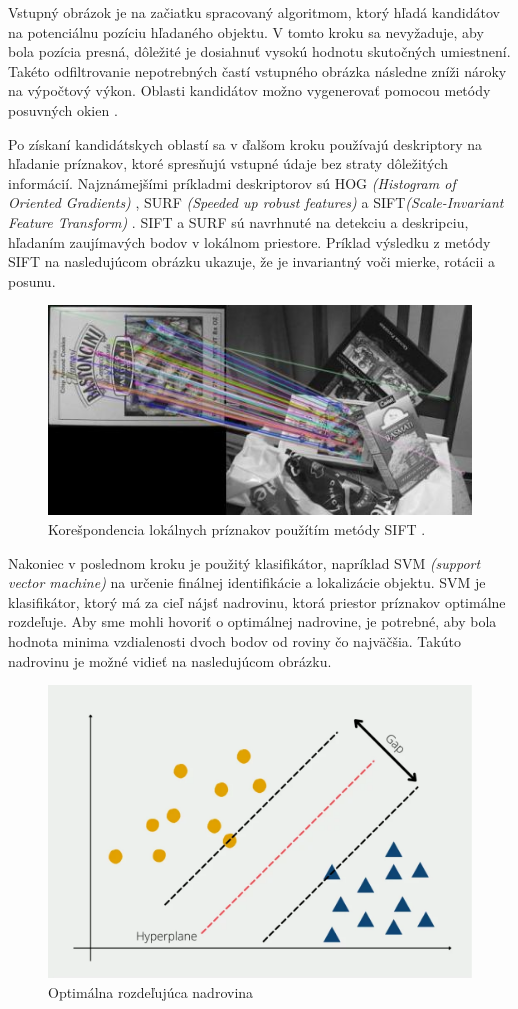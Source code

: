 Vstupný obrázok je na začiatku spracovaný algoritmom, ktorý hľadá kandidátov na potenciálnu pozíciu hľadaného objektu. V tomto kroku sa nevyžaduje, aby bola pozícia presná, dôležité je dosiahnuť vysokú hodnotu skutočných umiestnení. Takéto odfiltrovanie nepotrebných častí vstupného obrázka následne zníži nároky na výpočtový výkon. Oblasti kandidátov možno vygenerovať pomocou metódy posuvných okien \cite{sel-search}.

Po získaní kandidátskych oblastí sa v ďalšom kroku používajú deskriptory na hľadanie príznakov, ktoré spresňujú vstupné údaje bez straty dôležitých informácií. Najznámejšími príkladmi deskriptorov sú HOG \textit{(Histogram of Oriented Gradients)} \cite{HOG}, SURF \textit{(Speeded up robust features)} \cite{SURF} a SIFT\textit{(Scale-Invariant Feature Transform)} \cite{SIFT}. SIFT a SURF sú navrhnuté na detekciu a deskripciu, hľadaním zaujímavých bodov v lokálnom priestore. Príklad výsledku z metódy SIFT na nasledujúcom obrázku ukazuje, že je invariantný voči mierke, rotácii a posunu.

\begin{figure}[H]
    \centering
    \includegraphics[width=.6\textwidth]{images/01/sift.jpeg}
    \caption{Korešpondencia lokálnych príznakov použítím metódy SIFT \cite{sift-img}.}
    \label{img:sift}
\end{figure}

Nakoniec v poslednom kroku je použitý klasifikátor, napríklad SVM \textit{(support vector machine)} \cite{SVM} na určenie finálnej identifikácie a lokalizácie objektu.
SVM je klasifikátor, ktorý má za cieľ nájsť nadrovinu, ktorá priestor príznakov optimálne rozdeľuje. Aby sme mohli hovoriť o optimálnej nadrovine, je potrebné, aby bola hodnota minima vzdialenosti dvoch bodov od roviny čo najväčšia. Takúto nadrovinu je možné vidieť na nasledujúcom obrázku.
\begin{figure}[H]
    \centering
    \includegraphics[width=.6\textwidth]{images/01/svm.png}
    \caption{Optimálna rozdeľujúca nadrovina}
    \label{img:svm}
\end{figure}

